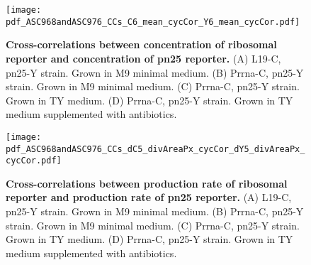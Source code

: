 \begin{figure}
    \centering
    \texttt{[image: pdf\_ASC968andASC976\_CCs\_C6\_mean\_cycCor\_Y6\_mean\_cycCor.pdf]}
    \caption{ 
        \textbf{Cross-correlations between concentration of ribosomal reporter and concentration of pn25 reporter.}
        (A) L19-C, pn25-Y strain. Grown in M9 minimal medium.
        (B) Prrna-C, pn25-Y strain. Grown in M9 minimal medium.
        (C) Prrna-C, pn25-Y strain. Grown in TY medium.
        (D) Prrna-C, pn25-Y strain. Grown in TY medium supplemented with antibiotics.
    }
    \label{fig:ribo:CCsEmuY}
\end{figure}

\begin{figure}
    \centering
    \texttt{[image: pdf\_ASC968andASC976\_CCs\_dC5\_divAreaPx\_cycCor\_dY5\_divAreaPx\_cycCor.pdf]}
    \caption{ 
        \textbf{Cross-correlations between production rate of ribosomal reporter and production rate of pn25 reporter.}
        (A) L19-C, pn25-Y strain. Grown in M9 minimal medium.
        (B) Prrna-C, pn25-Y strain. Grown in M9 minimal medium.
        (C) Prrna-C, pn25-Y strain. Grown in TY medium.
        (D) Prrna-C, pn25-Y strain. Grown in TY medium supplemented with antibiotics.
    }
    \label{fig:ribo:CCsPmuY}
\end{figure}





